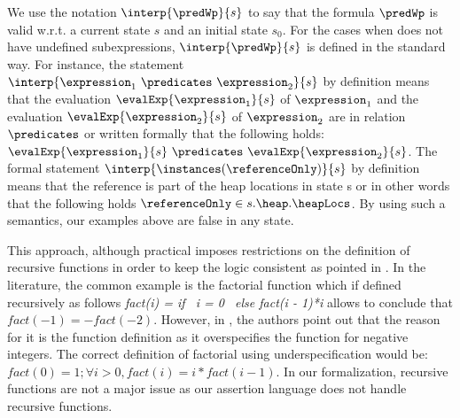  We use the notation $\interp{\predWp}{s}$ to say that the formula  $\predWp$ is valid w.r.t.
 a current state  $s$ and an initial state $s_0$. 
 For the cases when \predWp{} does not have undefined subexpressions,
 $\interp{\predWp}{s}$ is defined in the standard way.  
For instance, the statement $\interp{\expression_1 \  \predicates \  \expression_2 }{s}$
 by definition means that the evaluation   $\evalExp{ \expression_1 }{s } $ of $\expression_1$ and the evaluation $\evalExp{ \expression_2 }{s } $ of $\expression_2$
 are in relation $ \predicates$ or written formally that the following holds:
 $\evalExp{ \expression_1 }{s } \ \predicates \ \evalExp{ \expression_2 }{s}$.
 The formal statement   $\interp{\instances(\referenceOnly)}{s}$  by definition means that the reference  is part of the heap locations in state s or in other words 
 that the following holds  $\referenceOnly \in s.\heap.\heapLocs $.
By using such a semantics, our examples above are false in any state.


This approach, although practical imposes restrictions on  the definition 
of recursive functions in order to keep the logic consistent as pointed in \cite{J95PFL}.
In the literature, the common example is the factorial function which if defined recursively 
as follows \textit{ fact(i) = if \ i = 0 \ else  fact(i - 1)*i }   allows to conclude that $ fact(-1) = -fact(-2) $. However,
in \cite{gries95avoiding}, the authors point out that the reason for it is the function definition as it overspecifies  the function for negative integers.
The correct definition of factorial using underspecification would be: $ fact(0) = 1; \forall i > 0, fact(i) = i*fact(i - 1) $.
In our formalization, recursive functions are not a major issue as our assertion language does not handle recursive functions. 






